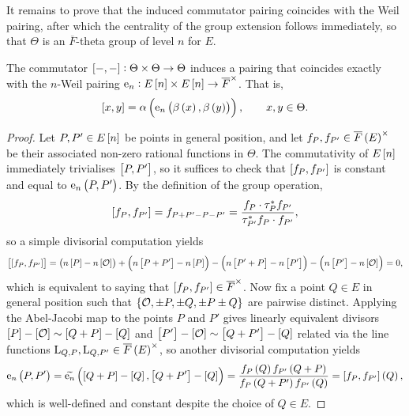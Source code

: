 It remains to prove that the induced commutator pairing coincides with the Weil pairing, after which the centrality of the group extension follows immediately, so that $ \Theta $ is an $ \overline{F} $-theta group of level $ n $ for $ E $.

\begin{proposition}
\label{prop:weilpairing}
The commutator $ \sbr{-, -} : \Theta \times \Theta \to \Theta $ induces a pairing that coincides exactly with the $ n $-Weil pairing $ \e_n : E\sbr{n} \times E\sbr{n} \to \overline{F}^\times $. That is,
$$ \sbr{x, y} = \alpha\br{\e_n\br{\beta\br{x}, \beta\br{y}}}, \qquad x, y \in \Theta. $$
\end{proposition}

\begin{proof}
Let $ P, P' \in E\sbr{n} $ be points in general position, and let $ f_P, f_{P'} \in \overline{F}\br{E}^\times $ be their associated non-zero rational functions in $ \Theta $. The commutativity of $ E\sbr{n} $ immediately trivialises $ \sbr{P, P'} $, so it suffices to check that $ \sbr{f_P, f_{P'}} $ is constant and equal to $ \e_n\br{P, P'} $. By the definition of the group operation,
$$ \sbr{f_P, f_{P'}} = f_{P + P' - P - P'} = \dfrac{f_P \cdot \tau_P^*f_{P'}}{\tau_{P'}^*f_P \cdot f_{P'}}, $$
so a simple divisorial computation yields
$$ \sbr{\sbr{f_P, f_{P'}}} = \br{n\sbr{P} - n\sbr{\OOO}} + \br{n\sbr{P + P'} - n\sbr{P}} - \br{n\sbr{P' + P} - n\sbr{P'}} - \br{n\sbr{P'} - n\sbr{\OOO}} = 0, $$
which is equivalent to saying that $ \sbr{f_P, f_{P'}} \in \overline{F}^\times $. Now fix a point $ Q \in E $ in general position such that $ \cbr{\OOO, \pm P, \pm Q, \pm P \pm Q} $ are pairwise distinct. Applying the Abel-Jacobi map to the points $ P $ and $ P' $ gives linearly equivalent divisors $ \sbr{P} - \sbr{\OOO} \sim \sbr{Q + P} - \sbr{Q} $ and $ \sbr{P'} - \sbr{\OOO} \sim \sbr{Q + P'} - \sbr{Q} $ related via the line functions $ \L_{Q, P}, \L_{Q, P'} \in \overline{F}\br{E}^\times $, so another divisorial computation yields
\begin{align*}
\e_n\br{P, P'} = \widetilde{\e_n}\br{\sbr{Q + P} - \sbr{Q}, \sbr{Q + P'} - \sbr{Q}} = \dfrac{f_P\br{Q}f_{P'}\br{Q + P}}{f_P\br{Q + P'}f_{P'}\br{Q}} = \sbr{f_P, f_{P'}}\br{Q},
\end{align*}
which is well-defined and constant despite the choice of $ Q \in E $.
\end{proof}

